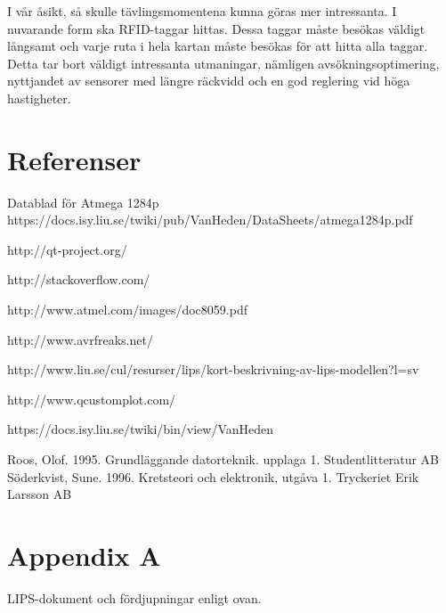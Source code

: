 \documentclass[a4paper,12pt,fleqn]{article}
\begin{document}
I vår åsikt, så skulle tävlingsmomentena kunna göras mer intressanta. I nuvarande form ska RFID-taggar hittas. Dessa taggar måste besökas väldigt långsamt och varje ruta i hela kartan måste besökas för att hitta alla taggar. Detta tar bort väldigt intressanta utmaningar, nämligen avsökningsoptimering, nyttjandet av sensorer med längre räckvidd och en god reglering vid höga hastigheter.

\newpage
\section*{Referenser}

Datablad för Atmega 1284p https://docs.isy.liu.se/twiki/pub/VanHeden/DataSheets/atmega1284p.pdf

http://qt-project.org/

http://stackoverflow.com/

http://www.atmel.com/images/doc8059.pdf

http://www.avrfreaks.net/

http://www.liu.se/cul/resurser/lips/kort-beskrivning-av-lips-modellen?l=sv

http://www.qcustomplot.com/

https://docs.isy.liu.se/twiki/bin/view/VanHeden

Roos, Olof. 1995. Grundläggande datorteknik. upplaga 1. Studentlitteratur AB
Söderkvist, Sune. 1996. Kretsteori och elektronik, utgåva 1. Tryckeriet Erik Larsson AB



\newpage
\appendix
\pagestyle{empty}
\section*{Appendix A}


%

%

\label{komuppg.}
LIPS-dokument och fördjupningar enligt ovan.
\end{document}
